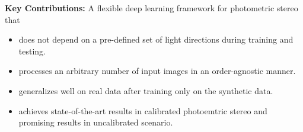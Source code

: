 \documentclass[landscape,a0paper,fontscale=0.292]{baposter}
\begin{document}
\begin{poster}
{    \vspace{-0.8em}
    \textbf{\color{blue}Key Contributions:}
    A flexible deep learning framework for photometric stereo that 
    \begin{itemize}
        \item does not depend on a pre-defined set of light directions during training and testing.
        \item processes an arbitrary number of input images in an order-agnostic manner.
        \item generalizes well on real data after training only on the synthetic data.
        \item achieves state-of-the-art results in calibrated photoemtric stereo and promising results in uncalibrated scenario.
    \end{itemize}  
}

\end{poster}
\end{document}
